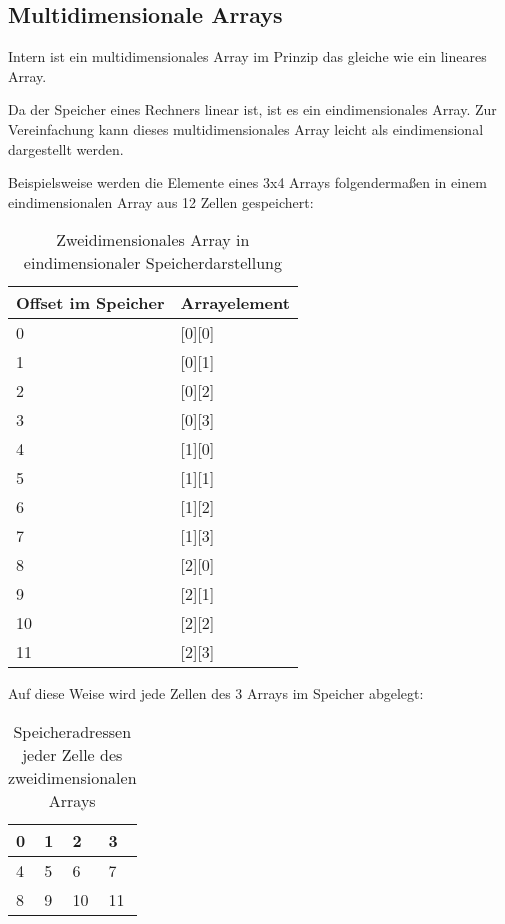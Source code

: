 \subsection{Multidimensionale Arrays}
Intern ist ein multidimensionales Array im Prinzip das gleiche wie ein lineares Array.

Da der Speicher eines Rechners linear ist, ist es ein eindimensionales Array.
Zur Vereinfachung kann dieses multidimensionales Array leicht als eindimensional dargestellt werden.

Beispielsweise werden die Elemente eines 3x4 Arrays folgendermaßen in einem eindimensionalen Array aus 12 Zellen
gespeichert:

\begin{table}[H]
\centering
\begin{tabular}{ | l | l | }
\hline
Offset im Speicher & Arrayelement \\
\hline
0 & [0][0] \\
\hline
1 & [0][1] \\
\hline
2 & [0][2] \\
\hline
3 & [0][3] \\
\hline
4 & [1][0] \\
\hline
5 & [1][1] \\
\hline
6 & [1][2] \\
\hline
7 & [1][3] \\
\hline
8 & [2][0] \\
\hline
9 & [2][1] \\
\hline
10 & [2][2] \\
\hline
11 & [2][3] \\
\hline
\end{tabular}
\caption{Zweidimensionales Array in eindimensionaler Speicherdarstellung}
\end{table}

Auf diese Weise wird jede Zellen des 3 Arrays im Speicher abgelegt:

\begin{table}[H]
\centering
\begin{tabular}{ | l | l | l | l | }
\hline                        
0 & 1 & 2 & 3 \\
\hline  
4 & 5 & 6 & 7 \\
\hline  
8 & 9 & 10 & 11 \\
\hline  
\end{tabular}
\caption{Speicheradressen jeder Zelle des zweidimensionalen Arrays}
\end{table}

